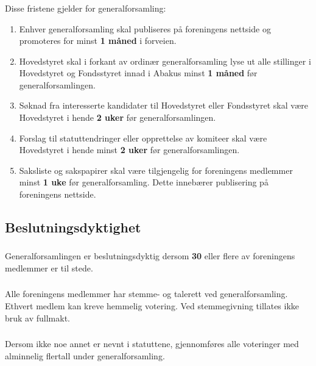 \subsubsection{}
Disse fristene gjelder for generalforsamling:
\begin{enumerate}[label=\alph*)]
    \item Enhver generalforsamling skal publiseres på foreningens nettside og promoteres for minst \textbf{1 måned} i forveien.
    \item Hovedstyret skal i forkant av ordinær generalforsamling lyse ut alle stillinger i Hovedstyret og 
    Fondsstyret innad i Abakus minst \textbf{1 måned} før generalforsamlingen. 
    \item Søknad fra interesserte kandidater til Hovedstyret eller Fondsstyret skal være Hovedstyret 
    i hende \textbf{2 uker} før generalforsamlingen.
    \item Forslag til statuttendringer eller opprettelse av komiteer skal være Hovedstyret i 
    hende minst \textbf{2 uker} før generalforsamlingen. 
    \item Saksliste og sakspapirer skal være tilgjengelig for foreningens medlemmer minst \textbf{1 uke} 
    før generalforsamling. Dette innebærer publisering på foreningens nettside.
\end{enumerate}

\subsection{Beslutningsdyktighet}
\subsubsection{}
Generalforsamlingen er beslutningsdyktig dersom \textbf{30} eller flere av foreningens medlemmer er til stede. 

\subsubsection{}
Alle foreningens medlemmer har stemme- og talerett ved generalforsamling. Ethvert medlem kan kreve hemmelig votering. 
Ved stemmegivning tillates ikke bruk av fullmakt. 

\subsubsection{}
Dersom ikke noe annet er nevnt i statuttene, gjennomføres alle voteringer med alminnelig flertall under generalforsamling.

